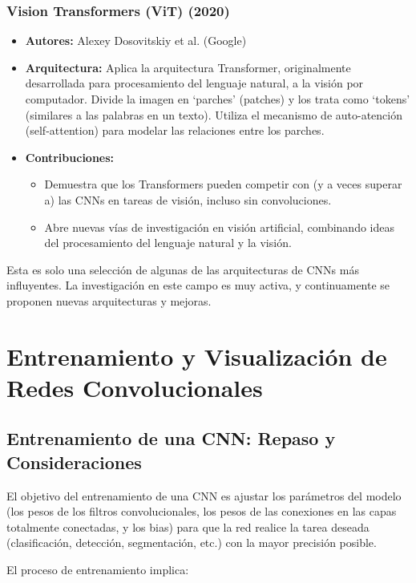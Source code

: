 \documentclass{article}
\begin{document}
\subsubsection{Vision Transformers (ViT) (2020)}
\begin{itemize}
\item   \textbf{Autores:} Alexey Dosovitskiy et al. (Google)
\item   \textbf{Arquitectura:} Aplica la arquitectura Transformer, originalmente desarrollada para procesamiento del lenguaje natural, a la visión por computador.  Divide la imagen en `parches' (patches) y los trata como `tokens' (similares a las palabras en un texto).  Utiliza el mecanismo de auto-atención (self-attention) para modelar las relaciones entre los parches.
\item   \textbf{Contribuciones:}
    \begin{itemize}
    \item Demuestra que los Transformers pueden competir con (y a veces superar a) las CNNs en tareas de visión, incluso sin convoluciones.
    \item Abre nuevas vías de investigación en visión artificial, combinando ideas del procesamiento del lenguaje natural y la visión.
    \end{itemize}
\end{itemize}

Esta es solo una selección de algunas de las arquitecturas de CNNs más influyentes. La investigación en este campo es muy activa, y continuamente se proponen nuevas arquitecturas y mejoras.

\section{Entrenamiento y Visualización de Redes Convolucionales}

\subsection{Entrenamiento de una CNN: Repaso y Consideraciones}

El objetivo del entrenamiento de una CNN es ajustar los parámetros del modelo (los pesos de los filtros convolucionales, los pesos de las conexiones en las capas totalmente conectadas, y los bias) para que la red realice la tarea deseada (clasificación, detección, segmentación, etc.) con la mayor precisión posible.

El proceso de entrenamiento implica:
\end{document}
